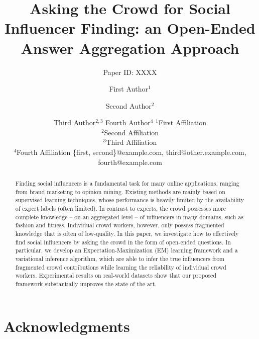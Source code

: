 \documentclass{article}
\title{Asking the Crowd for Social Influencer Finding: an Open-Ended Answer Aggregation Approach}
\author{
Paper ID: XXXX
}
\author{
First Author$^1$
\and
Second Author$^2$\and
Third Author$^{2,3}$\And
Fourth Author$^4$
\affiliations
$^1$First Affiliation\\
$^2$Second Affiliation\\
$^3$Third Affiliation\\
$^4$Fourth Affiliation
\emails
\{first, second\}@example.com,
third@other.example.com,
fourth@example.com
}
\begin{document}
\maketitle

\begin{abstract}
Finding social influencers is a fundamental task for many online applications, ranging from brand marketing to opinion mining. Existing methods are mainly based on supervised  learning techniques, whose performance is heavily limited by the availability of expert labels (often limited). In contrast to experts, the crowd possesses more complete knowledge -- on an aggregated level -- of influencers in many domains, such as fashion and fitness. Individual crowd workers, however, only possess fragmented knowledge that is often of low-quality. In this paper, we investigate how to effectively find social influencers by asking the crowd in the form of open-ended questions. In particular, we develop an Expectation-Maximization (EM) learning framework and a variational inference algorithm, which are able to infer the true influencers from fragmented crowd contributions while learning the reliability of individual crowd workers. Experimental results on real-world datasets show that our proposed framework substantially improves the state of the art. 
\end{abstract}





\label{sec:intro}


\label{sec:related}


\label{sec:method}


\label{sec:result}


\label{sec:conclusion}




\section*{Acknowledgments}





\end{document}
